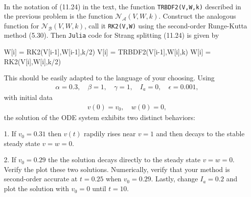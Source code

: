 \documentclass[12pt]{report}
\begin{document}
\begin{problem}
\begin{align*}
\end{align*}
In the notation of (11.24) in the text, the function \verb`TRBDF2(V,W,k)` described in the previous problem is the function $\mathcal N_{\mathcal A}(V,W,k)$.  Construct the analogous function for $\mathcal N_{\mathcal B}(V,W,k)$, call it \verb`RK2(V,W)` using the second-order Runge-Kutta method (5.30).
Then \verb`Julia` code for Strang splitting (11.24) is given by
\begin{jllisting}
W[i] = RK2(V[i-1],W[i-1],k/2)
V[i] = TRBDF2(V[i-1],W[i],k)
W[i] = RK2(V[i],W[i],k/2)
\end{jllisting}
This should be easily adapted to the language of your choosing.
Using
\begin{align*}
\alpha = 0.3, \quad \beta = 1, \quad \gamma = 1, \quad I_a = 0, \quad \epsilon = 0.001,
\end{align*}
with initial data
\begin{align*}
v(0) = v_0, \quad w(0) = 0,
\end{align*}
the solution of the ODE system exhibits two distinct behaviors:

1. If $v_0 = 0.31$ then $v(t)$ rapdily rises near $v = 1$ and then decays to the stable steady state $v = w = 0$.

2. If $v_0 = 0.29$ the the solution decays directly to the steady state $v = w = 0$.
\noindent
Verify the plot these two solutions. Numerically, verify that your method is second-order accurate at $t = 0.25$ when $v_0 = 0.29$.
Lastly, change $I_a = 0.2$ and plot the solution with $v_0 = 0$ until $t = 10$.
\end{problem}
\end{document}
